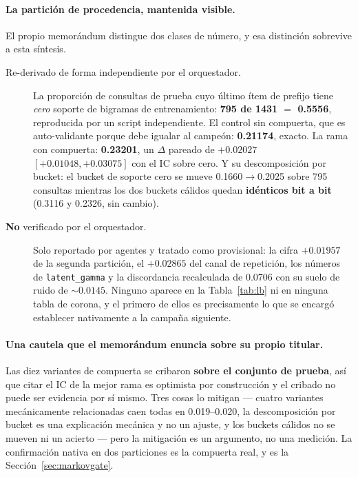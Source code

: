 \documentclass[11pt]{article}
\begin{document}
\paragraph{La partición de procedencia, mantenida visible.} El propio memorándum
distingue dos clases de número, y esa distinción sobrevive a esta síntesis.
\begin{description}
  \item[Re-derivado de forma independiente por el orquestador.] La proporción de
  consultas de prueba cuyo último ítem de prefijo tiene \emph{cero} soporte de
  bigramas de entrenamiento: \textbf{\num{795} de \num{1431} $=$ \num{0.5556}},
  reproducida por un script independiente. El control sin compuerta, que es
  auto-validante porque debe igualar al campeón: \textbf{\num{0.21174}}, exacto. La
  rama con compuerta: \textbf{\num{0.23201}}, un $\Delta$ pareado de
  $+\num{0.02027}$ $[+\num{0.01048}, +\num{0.03075}]$ con el IC sobre cero. Y su
  descomposición por bucket: el bucket de soporte cero se mueve
  \num{0.1660}$\to$\num{0.2025} sobre \num{795} consultas mientras los dos buckets
  cálidos quedan \textbf{idénticos bit a bit} (\num{0.3116} y \num{0.2326}, sin
  cambio).
  \item[\textbf{No} verificado por el orquestador.] Solo reportado por agentes y
  tratado como provisional: la cifra $+\num{0.01957}$ de la segunda partición, el
  $+\num{0.02865}$ del canal de repetición, los números de
  \texttt{latent\_gamma} y la discordancia recalculada de \num{0.0706} con su suelo
  de ruido de ${\sim}\num{0.0145}$. Ninguno aparece en la Tabla~\ref{tab:lb} ni
  en ninguna tabla de corona, y el primero de ellos es precisamente lo que se
  encargó establecer nativamente a la campaña siguiente.
\end{description}

\paragraph{Una cautela que el memorándum enuncia sobre su propio titular.} Las
diez variantes de compuerta se cribaron \textbf{sobre el conjunto de prueba}, así
que citar el IC de la mejor rama es optimista por construcción y el cribado no
puede ser evidencia por sí mismo. Tres cosas lo mitigan --- cuatro variantes
mecánicamente relacionadas caen todas en \numrange{0.019}{0.020}, la descomposición
por bucket es una explicación mecánica y no un ajuste, y los buckets cálidos no se
mueven ni un acierto --- pero la mitigación es un argumento, no una medición. La
confirmación nativa en dos particiones es la compuerta real, y es la
Sección~\ref{sec:markovgate}.
\end{document}
